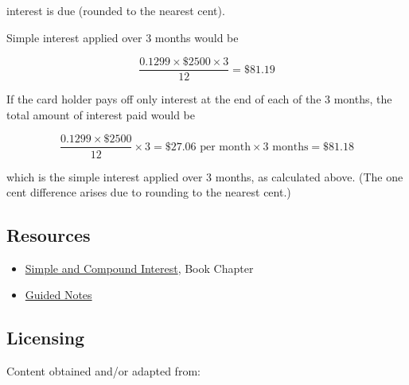 interest is due (rounded to the nearest cent).



Simple interest applied over 3 months would be



$$\frac{0.1299 \times \$2500 \times 3}{12} = \$81.19$$



If the card holder pays off only interest at the end of each of the 3 months, the total
amount of interest paid would be



$$\frac{0.1299 \times \$2500}{12} \times 3 = \$27.06\text{ per month} \times 3\text{ months} =\$81.18$$



which is the simple interest applied over 3 months, as calculated above. (The one cent
difference arises due to rounding to the nearest cent.)




\subsection{Resources}
\label{sss:reso-55b5}




\begin{itemize}
    \item \href{https://mathresearch.utsa.edu/wikiFiles/MAT1053/Simple_and_Compound_Interest/MAT1053_M7.1Simple_and_Compound_Interest.pdf}{Simple and Compound Interest}, Book Chapter
    \item \href{https://mathresearch.utsa.edu/wikiFiles/MAT1053/Simple_and_Compound_Interest/MAT1053_M7.1Simple_and_Compound_InterestGN.pdf}{Guided Notes}
\end{itemize}


\subsection{Licensing}
\label{sss:lice-7352}




Content obtained and/or adapted from:



